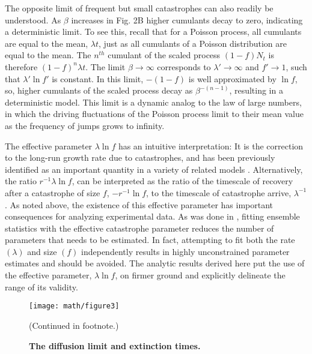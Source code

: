 The opposite limit of frequent but small catastrophes can also readily be understood. As $\beta$ increases in Fig. 2B higher cumulants decay to zero, indicating a deterministic limit. To see this, recall that for a Poisson process, all cumulants are equal to the mean, $\lambda t$, just as all cumulants of a Poisson distribution are equal to the mean.  The $n^{th}$ cumulant of the scaled process $(1-f)N_t$ is therefore $(1-f)^n\lambda t$. The limit $\beta \to \infty$ corresponds to $\lambda'\to\infty$ and $f'\to 1$, such that $\lambda'\ln f'$ is constant.  In this limit, $-(1-f)$ is well approximated by $\ln f$, so, higher cumulants of the scaled process decay as $\beta^{-(n-1)}$, resulting in a deterministic model. This limit is a dynamic analog to the law of large numbers, in which the driving fluctuations of the Poisson process limit to their mean value as the frequency of jumps grows to infinity. 

The effective parameter $\lambda\ln f$ has an intuitive interpretation:  It is the correction to the long-run growth rate due to catastrophes, and has been previously identified as an important quantity in a variety of related models \cite{bao2011competitive,hansonBook,lande1993risks}.  Alternatively, the ratio $r^{-1}\lambda\ln f$, can be interpreted as the ratio of the timescale of recovery after a catastrophe of size $f$, $-r^{-1}\ln f$, to the timescale of catastrophe arrive, $\lambda^{-1}$. As noted above, the existence of this effective parameter has important consequences for analyzing experimental data.  As was done in \cite{wiles_host_2016}, fitting ensemble statistics with the effective catastrophe parameter reduces the number of parameters that needs to be estimated.  In fact, attempting to fit both the rate $(\lambda)$ and size $(f)$ independently results in highly unconstrained parameter estimates  \cite{wiles_host_2016} and should be avoided.  The analytic results derived here put the use of the effective parameter, $\lambda\ln f$, on firmer ground and explicitly delineate the range of its validity.  

 \begin{figure}
	\centerline{
		\texttt{[image: math/figure3]}}
	\caption{\textbf{The diffusion limit and extinction times.}} {(Continued in footnote.)}
	\label{fig:math_fig3}
\end{figure}


